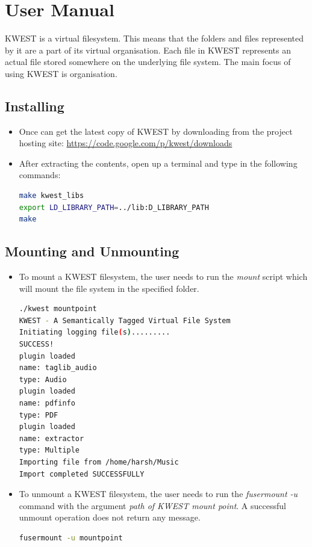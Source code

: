 \setcounter{section}{0}
\chapter*{User Manual}

KWEST is a virtual filesystem. This means that the folders and files represented by it are a part of its virtual organisation. Each file in KWEST represents an actual file stored somewhere on the underlying file system. The main focus of using KWEST is organisation.

\section{Installing}
\begin{itemize}
\item Once can get the latest copy of KWEST by downloading from the project hosting site: \url{https://code.google.com/p/kwest/downloads}
\item After extracting the contents, open up a terminal and type in the following commands:
\begin{lstlisting}[language=bash,frame=single]
make kwest_libs
export LD_LIBRARY_PATH=../lib:D_LIBRARY_PATH
make
\end{lstlisting}
\end{itemize}

\section{Mounting and Unmounting}

\begin{itemize}
\item To mount a KWEST filesystem, the user needs to run the \textit{mount} script which will mount the file system in the specified folder. 
\begin{lstlisting}[language=bash,frame=single]
./kwest mountpoint
KWEST - A Semantically Tagged Virtual File System
Initiating logging file(s).........
SUCCESS!
plugin loaded
name: taglib_audio
type: Audio
plugin loaded
name: pdfinfo
type: PDF
plugin loaded
name: extractor
type: Multiple
Importing file from /home/harsh/Music
Import completed SUCCESSFULLY
\end{lstlisting}
\item To unmount a KWEST filesystem, the user needs to run the \textit{fusermount -u} command with the argument \textit{path of KWEST mount point}. A successful unmount operation does not return any message.
\begin{lstlisting}[language=bash,frame=single]
fusermount -u mountpoint
\end{lstlisting}
\end{itemize}


